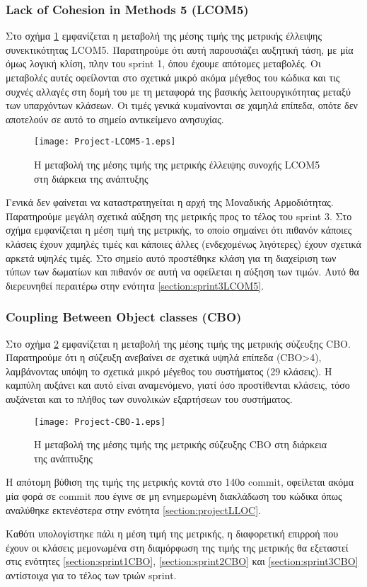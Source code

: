 \subsubsection{Lack of Cohesion in Methods 5 (LCOM5)}

Στο σχήμα \ref{fig:projectLCOM5} εμφανίζεται η μεταβολή της μέσης τιμής
της μετρικής έλλειψης συνεκτικότητας LCOM5. Παρατηρούμε ότι αυτή
παρουσιάζει αυξητική τάση, με μία όμως λογική κλίση, πλην
του sprint 1, όπου έχουμε απότομες μεταβολές. Οι μεταβολές αυτές
οφείλονται στο σχετικά μικρό ακόμα μέγεθος του κώδικα και τις συχνές
αλλαγές στη δομή του με τη μεταφορά της βασικής λειτουργικότητας μεταξύ
των υπαρχόντων κλάσεων. Οι τιμές γενικά κυμαίνονται
σε χαμηλά επίπεδα, οπότε δεν αποτελούν σε αυτό το σημείο αντικείμενο
ανησυχίας.

\begin{figure}
\centering
\texttt{[image: Project-LCOM5-1.eps]}
\caption{Η μεταβολή της μέσης τιμής της μετρικής έλλειψης συνοχής
LCOM5 στη διάρκεια της ανάπτυξης}
\label{fig:projectLCOM5}
\end{figure}

Γενικά δεν φαίνεται να καταστρατηγείται η αρχή της Μοναδικής
Αρμοδιότητας. Παρατηρούμε μεγάλη σχετικά αύξηση της μετρικής προς το τέλος του
sprint 3.
Στο σχήμα εμφανίζεται η μέση τιμή της μετρικής, το
οποίο σημαίνει ότι πιθανόν κάποιες κλάσεις έχουν χαμηλές τιμές και
κάποιες άλλες (ενδεχομένως λιγότερες) έχουν σχετικά αρκετά υψηλές τιμές.
Στο σημείο αυτό προστέθηκε κλάση για τη διαχείριση των
τύπων των δωματίων και πιθανόν σε αυτή να οφείλεται η αύξηση των τιμών.
Αυτό θα διερευνηθεί περαιτέρω στην ενότητα
\ref{section:sprint3LCOM5}.

\subsubsection{Coupling Between Object classes (CBO)}

Στο σχήμα \ref{fig:projectCBO} εμφανίζεται η μεταβολή της μέσης τιμής της
μετρικής σύζευξης CBO. Παρατηρούμε ότι η σύζευξη ανεβαίνει σε σχετικά υψηλά επίπεδα
(CBO>4), λαμβάνοντας υπόψη το σχετικά μικρό μέγεθος του συστήματος
(29 κλάσεις). Η καμπύλη αυξάνει και αυτό είναι αναμενόμενο, γιατί όσο
προστίθενται κλάσεις, τόσο αυξάνεται και το πλήθος των συνολικών
εξαρτήσεων του συστήματος.

\begin{figure}
\centering
\texttt{[image: Project-CBO-1.eps]}
\caption{Η μεταβολή της μέσης τιμής της μετρικής σύζευξης
CBO στη διάρκεια της ανάπτυξης}
\label{fig:projectCBO}
\end{figure}

Η απότομη βύθιση της τιμής της μετρικής κοντά στο 140ο commit, οφείλεται
ακόμα μία φορά σε commit που έγινε σε μη ενημερωμένη διακλάδωση του
κώδικα όπως αναλύθηκε εκτενέστερα στην ενότητα \ref{section:projectLLOC}.

Καθότι υπολογίστηκε πάλι η μέση τιμή της μετρικής, η διαφορετική επιρροή
που έχουν οι κλάσεις μεμονωμένα στη διαμόρφωση της τιμής της μετρικής θα
εξεταστεί στις ενότητες \ref{section:sprint1CBO},
\ref{section:sprint2CBO} και \ref{section:sprint3CBO} αντίστοιχα για το
τέλος των τριών sprint.

